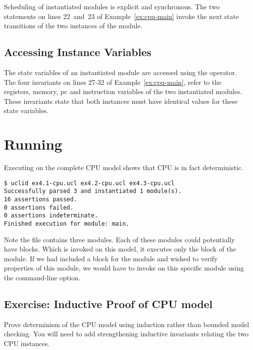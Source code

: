 Scheduling of instantiated modules is explicit and synchronous. The two  statements on lines 22~and~23 of Example~\ref{ex:cpu-main} invoke the next state transitions of the two instances of the  module.

\subsection{Accessing Instance Variables}
The state variables of an instantiated module are accessed using the  operator. The four invariants on lines 27-32 of Example~\ref{ex:cpu-main}, refer to the registers, memory, pc and instruction variables of the two instantiated modules. These invariants state that both instances must have identical values for these state variables.


\section{Running \uclid{}}

Executing \uclid{} on the complete CPU model shows that CPU is in fact deterministic. 

\begin{Verbatim}[frame=single, samepage=true]
$ uclid ex4.1-cpu.ucl ex4.2-cpu.ucl ex4.3-cpu.ucl 
Successfully parsed 3 and instantiated 1 module(s).
16 assertions passed.
0 assertions failed.
0 assertions indeterminate.
Finished execution for module: main.
\end{Verbatim}

Note the file  contains three modules. Each of these modules could potentially have  blocks. Which \uclid{} is invoked on this model, it executes only the  block of the  module.  If we had included a  block for the  module and wished to verify properties of this module, we would have to invoke \uclid{} on this specific module using the  command-line option.

\subsection{Exercise: Inductive Proof of CPU model}
Prove determinism of the CPU model using induction rather than bounded model checking. You will need to add strengthening inductive invariants relating the two CPU instances.
